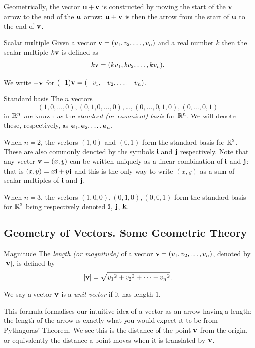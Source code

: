 Geometrically, the vector $\vb{u}+\vb{v}$ is constructed by moving the start of the $\vb{v}$ arrow to the end of the $\vb{u}$ arrow: $\vb{u}+\vb{v}$ is then the arrow from the start of $\vb{u}$ to the end of $\vb{v}$.

\begin{defn}{Scalar multiple}{}
Given a vector $\vb{v}=(v_1,v_2,\dots,v_n)$ and a real number $k$ then the scalar multiple $k\vb{v}$ is defined as 
\[ k\vb{v} = (kv_1,kv_2,\dots,kv_n). \]
\end{defn}

We write $-\vb{v}$ for $(-1)\vb{v}=(-v_1,-v_2,\dots,-v_n)$.

\begin{defn}{Standard basis}{}
The $n$ vectors
\[ (1,0,\dots,0), (0,1,0,\dots,0), \dots, (0,\dots,0,1,0), (0,\dots,0,1) \]
in $\mathbb R^n$ are known as the \emph{standard (or canonical) basis} for $\mathbb R^n$. We will denote these, respectively, as $\vb{e}_1,\vb{e}_2,\dots,\vb{e}_n$.
\end{defn}

When $n=2$, the vectors $(1,0)$ and $(0,1)$ form the standard basis for $\mathbb R^2$. These are also commonly denoted by the symbols $\vb{i}$ and $\vb{j}$ respectively. Note that any vector $\vb{v}=(x,y)$ can be written uniquely as a linear combination of $\vb{i}$ and $\vb{j}$: that is $(x,y)=x\vb{i}+y\vb{j}$ and this is the only way to write $(x,y)$ as a sum of scalar multiples of $\vb{i}$ and $\vb{j}$. 

When $n=3$, the vectors $(1,0,0), (0,1,0), (0,0,1)$ form the standard basis for $\mathbb R^3$ being respectively denoted $\vb{i}$, $\vb{j}$, $\vb{k}$.

\subsection{Geometry of Vectors. Some Geometric Theory}
\begin{defn}{Magnitude}{}
The \emph{length (or magnitude)} of a vector $\vb{v}=(v_1,v_2,\dots,v_n)$, denoted by $|\vb{v}|$, is defined by
\[ |\vb{v}| = \sqrt{{v_1}^2+{v_2}^2+\cdots+{v_n}^2}. \]
\end{defn}

We say a vector $\vb{v}$ is a \emph{unit vector} if it has length $1$.

This formula formalises our intuitive idea of a vector as an arrow having a length; the length of the arrow is exactly what you would expect it to be from Pythagoras' Theorem. We see this is the distance of the point $\vb{v}$ from the origin, or equivalently the distance a point moves when it is translated by $\vb{v}$.

